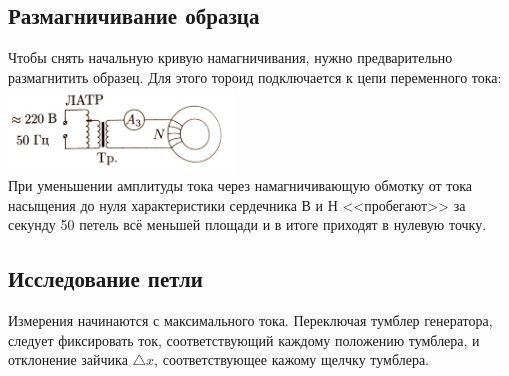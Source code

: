 \documentclass[11pt]{article}
\begin{document}
\subsection{Размагничивание образца}
Чтобы снять начальную кривую намагничивания, нужно предварительно размагнитить образец. Для этого тороид подключается к цепи переменного тока:\\
\includegraphics[width=6cm]{g4}\\
При уменьшении амплитуды тока через намагничивающую обмотку от тока насыщения до нуля характеристики сердечника В и Н <<пробегают>> за секунду 50 петель всё меньшей площади и в итоге приходят в нулевую точку.\\
\subsection{Исследование петли}
Измерения начинаются с максимального тока. Переключая тумблер генератора, следует фиксировать ток, соответствующий каждому положению тумблера, и отклонение зайчика $\triangle x$, соответствующее кажому щелчку тумблера.\\
\end{document}
